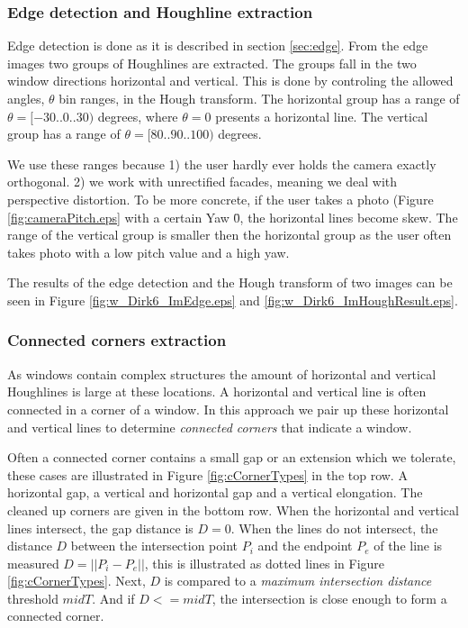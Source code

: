 \subsubsection{Edge detection and Houghline extraction}
Edge detection is done as it is described in section \ref{sec:edge}.
From the edge images two groups of Houghlines are extracted. 
The groups fall in the two window directions horizontal and vertical.
This is done by controling the allowed angles, $\theta$ bin ranges, in the Hough transform.
The horizontal group has a range of $\theta = [-30..0..30)$ degrees, where $\theta = 0$ presents a horizontal line. 
The vertical group has a range of $\theta = [80..90..100)$ degrees. 

We use these ranges because 1) the user hardly ever holds the camera exactly
orthogonal.  2) we work with unrectified facades, meaning we deal with
perspective distortion.  To be more concrete, if the user takes a photo (Figure
\ref{fig:cameraPitch.eps} with a certain Yaw \= 0, the horizontal lines become
skew.  The range of the vertical group is smaller then the horizontal group as
the user often takes photo with a low pitch value and a high yaw.

The results of the edge detection and the Hough transform of two images can be seen in Figure \ref{fig:w_Dirk6_ImEdge.eps} and
 \ref{fig:w_Dirk6_ImHoughResult.eps}.


\subsubsection{Connected corners extraction}
 As windows contain complex structures
the amount of horizontal and vertical Houghlines is large at these locations.
A horizontal and vertical line is often connected in a corner of a window.  In
this approach we pair up these horizontal and vertical lines to determine
\emph{connected corners} that indicate a window.

Often a connected corner contains a small gap or an extension which we tolerate,
these cases are illustrated in Figure \ref{fig:cCornerTypes} in the top row.
A horizontal gap, a vertical and horizontal gap and a vertical elongation. The
cleaned up corners are given in the bottom row.  When the horizontal and
vertical lines intersect, the gap distance is $D=0$.  When the lines do not
intersect, the distance $D$ between the intersection point $P_i$ and the endpoint $P_e$ of the
line is measured $D = ||P_i-P_e||$, this is illustrated as dotted lines in Figure
\ref{fig:cCornerTypes}.  Next, $D$ is compared to a \emph{maximum intersection
distance} threshold $midT$.  And if $D<=midT$, the intersection is close enough
to form a connected corner.\\

